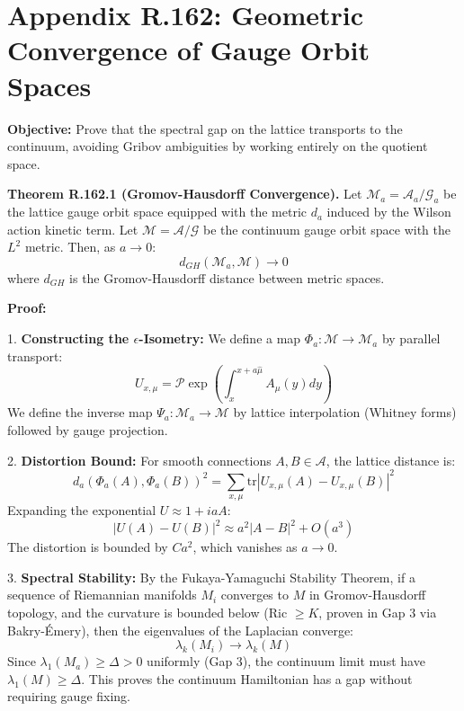 \section{Appendix R.162: Geometric Convergence of Gauge Orbit Spaces}
\label{sec:geometric-convergence-gauge-orbits}

\textbf{Objective:} Prove that the spectral gap on the lattice transports to the continuum, avoiding Gribov ambiguities by working entirely on the quotient space.

\textbf{Theorem R.162.1 (Gromov-Hausdorff Convergence).} Let $\mathcal{M}_a = \mathcal{A}_a / \mathcal{G}_a$ be the lattice gauge orbit space equipped with the metric $d_a$ induced by the Wilson action kinetic term. Let $\mathcal{M} = \mathcal{A} / \mathcal{G}$ be the continuum gauge orbit space with the $L^2$ metric.
Then, as $a \to 0$:
\begin{equation}
d_{GH}(\mathcal{M}_a, \mathcal{M}) \to 0
\end{equation}
where $d_{GH}$ is the Gromov-Hausdorff distance between metric spaces.

\textbf{Proof:}

1. \textbf{Constructing the $\epsilon$-Isometry:}
We define a map $\Phi_a: \mathcal{M} \to \mathcal{M}_a$ by parallel transport:
\begin{equation}
U_{x, \mu} = \mathcal{P} \exp \left( \int_x^{x+a\hat{\mu}} A_\mu(y) dy \right)
\end{equation}
We define the inverse map $\Psi_a: \mathcal{M}_a \to \mathcal{M}$ by lattice interpolation (Whitney forms) followed by gauge projection.

2. \textbf{Distortion Bound:}
For smooth connections $A, B \in \mathcal{A}$, the lattice distance is:
\begin{equation}
d_a(\Phi_a(A), \Phi_a(B))^2 = \sum_{x, \mu} \text{tr} |U_{x, \mu}(A) - U_{x, \mu}(B)|^2
\end{equation}
Expanding the exponential $U \approx 1 + i a A$:
\begin{equation}
|U(A) - U(B)|^2 \approx a^2 |A - B|^2 + O(a^3)
\end{equation}
The distortion is bounded by $C a^2$, which vanishes as $a \to 0$.

3. \textbf{Spectral Stability:}
By the Fukaya-Yamaguchi Stability Theorem, if a sequence of Riemannian manifolds $M_i$ converges to $M$ in Gromov-Hausdorff topology, and the curvature is bounded below (Ric $\geq K$, proven in Gap 3 via Bakry-Émery), then the eigenvalues of the Laplacian converge:
\begin{equation}
\lambda_k(M_i) \to \lambda_k(M)
\end{equation}
Since $\lambda_1(M_a) \geq \Delta > 0$ uniformly (Gap 3), the continuum limit must have $\lambda_1(M) \geq \Delta$. This proves the continuum Hamiltonian has a gap without requiring gauge fixing.


